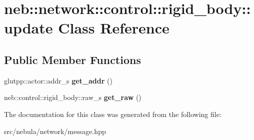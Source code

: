 \hypertarget{classneb_1_1network_1_1control_1_1rigid__body_1_1update}{\section{neb\-:\-:network\-:\-:control\-:\-:rigid\-\_\-body\-:\-:update \-Class \-Reference}
\label{classneb_1_1network_1_1control_1_1rigid__body_1_1update}
}
\subsection*{\-Public \-Member \-Functions}
\begin{DoxyCompactItemize}
\item 
\hypertarget{classneb_1_1network_1_1control_1_1rigid__body_1_1update_a4dbab97fac5f7d43af6c6bcb96f5f36f}{glutpp\-::actor\-::addr\-\_\-s {\bfseries get\-\_\-addr} ()}\label{classneb_1_1network_1_1control_1_1rigid__body_1_1update_a4dbab97fac5f7d43af6c6bcb96f5f36f}

\item 
\hypertarget{classneb_1_1network_1_1control_1_1rigid__body_1_1update_ab176f1660a245cb5789e5f923c056843}{neb\-::control\-::rigid\-\_\-body\-::raw\-\_\-s {\bfseries get\-\_\-raw} ()}\label{classneb_1_1network_1_1control_1_1rigid__body_1_1update_ab176f1660a245cb5789e5f923c056843}

\end{DoxyCompactItemize}


\-The documentation for this class was generated from the following file\-:\begin{DoxyCompactItemize}
\item 
src/nebula/network/message.\-hpp\end{DoxyCompactItemize}
